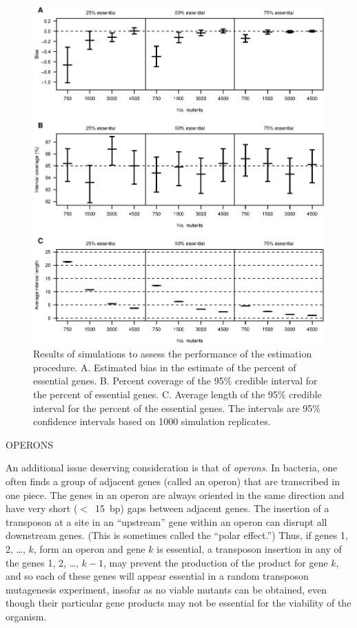 \documentclass[letterpaper]{article}
\begin{document}
\begin{multicols}{2}
\begin{figure}
\begin{center}
\includegraphics{Figs/fig7.ps}
\caption{Results of simulations to assess the performance of the
estimation procedure.  A. Estimated bias in the estimate of the
percent of essential genes.  B. Percent coverage of the 95\% credible
interval for the percent of essential genes.  C. Average length of the
95\% credible interval for the percent of the essential genes.  The
intervals are 95\% confidence intervals based on 1000
simulation replicates.}
\end{center}
\end{figure}


\smallskip \bigskip
\centerline{OPERONS}
\smallskip

An additional issue deserving consideration is that of \emph{operons}.
In bacteria, one often finds a group of adjacent genes (called an
operon) that are transcribed in one piece.  The genes in an operon are
always oriented in the same direction and have very short ($<$~15~bp)
gaps between adjacent genes.  The insertion of a transposon at a site
in an ``upstream'' gene within an operon can disrupt all downstream
genes.  (This is sometimes called the ``polar effect.'')  Thus, if
genes 1, 2, \dots, $k$, form an operon and gene $k$ is essential, a
transposon insertion in any of the genes 1, 2, \dots, $k-1$, may
prevent the production of the product for gene $k$, and so each of
these genes will appear essential in a random transposon mutagenesis
experiment, insofar as no viable mutants can be obtained, even though
their particular gene products may not be essential for the viability
of the organism.


\end{multicols}
\end{document}
